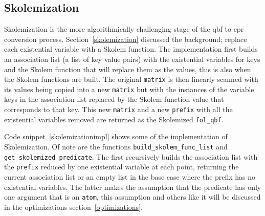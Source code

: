 \subsection{Skolemization}
Skolemization is the more algorithmically challenging stage of the \gls{qbf} to \gls{epr} conversion process. Section~\ref{skolemization} discussed the background; replace each existential variable with a Skolem function. The implementation first builds an association list (a list of key value pairs) with the existential variables for keys and the Skolem function that will replace them as the values, this is also when the Skolem functions are built. The original \texttt{matrix} is then linearly scanned with its values being copied into a new \texttt{matrix} but with the instances of the variable keys in the association list replaced by the Skolem function value that corresponds to that key. This new \texttt{matrix} and a new \texttt{prefix} with all the existential variables removed are returned as the Skolemized \texttt{fol\_qbf}.

Code snippet~\ref{skolemizationimpl} shows some of the implementation of Skolemization. Of note are the functions \texttt{build\_skolem\_func\_list} and \texttt{get\_skolemized\_predicate}. The first recursively builds the association list with the \texttt{prefix} reduced by one existential variable at each point, returning the current association list or an empty list in the base case where the prefix has no existential variables. The latter makes the assumption that the predicate has only one argument that is an \texttt{atom}, this assumption and others like it will be discussed in the optimizations section~\ref{optimizations}.

